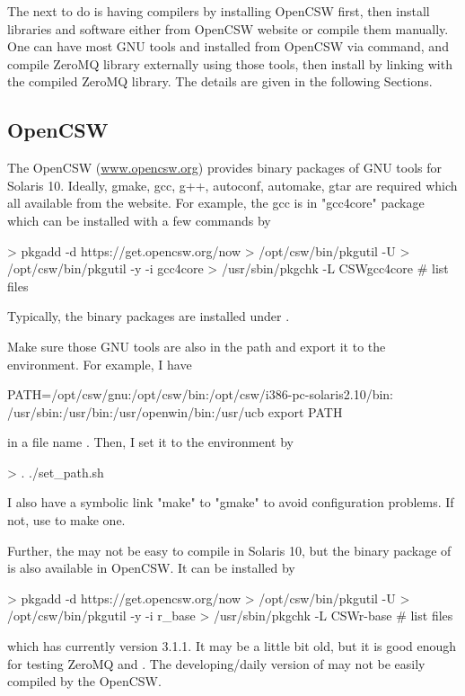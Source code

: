 The next to do is having compilers by installing OpenCSW first, then
install libraries and software either from OpenCSW website or compile
them manually. One can have most GNU tools and  installed
from OpenCSW via  command, and compile ZeroMQ library externally
using those tools, then install  by linking with the compiled
ZeroMQ library. The details are given in the following Sections.


\subsection[OpenCSW]{OpenCSW}
\label{sec:opencsw}
The OpenCSW (\url{www.opencsw.org}) provides binary packages of GNU tools
for Solaris 10. Ideally, gmake, gcc, g++, autoconf, automake, gtar are
required which all available from the website. For example, the gcc is in
"gcc4core" package which can be installed with a few 
commands by
\begin{Code}
> pkgadd -d https://get.opencsw.org/now
> /opt/csw/bin/pkgutil -U
> /opt/csw/bin/pkgutil -y -i gcc4core 
> /usr/sbin/pkgchk -L CSWgcc4core # list files
\end{Code}
Typically, the binary packages are installed under
.

Make sure those GNU tools are also in the path and export it to
the environment. For example, I have
\begin{Code}
PATH=/opt/csw/gnu:/opt/csw/bin:/opt/csw/i386-pc-solaris2.10/bin:
/usr/sbin:/usr/bin:/usr/openwin/bin:/usr/ucb
export PATH
\end{Code}
in a file name . Then, I set it to the environment by
\begin{Code}
> . ./set_path.sh
\end{Code}
I also have a symbolic link "make" to "gmake" to avoid configuration problems.
If not, use  to make one.

Further, the  may not be easy to compile in Solaris 10, but the
binary package of  is also available in OpenCSW. It can be
installed by
\begin{Code}
> pkgadd -d https://get.opencsw.org/now
> /opt/csw/bin/pkgutil -U
> /opt/csw/bin/pkgutil -y -i r_base 
> /usr/sbin/pkgchk -L CSWr-base # list files
\end{Code}
which has currently  version 3.1.1. It may be a little bit old,
but it is good enough for testing ZeroMQ and .
The developing/daily version of  may not be easily compiled
by the OpenCSW.


